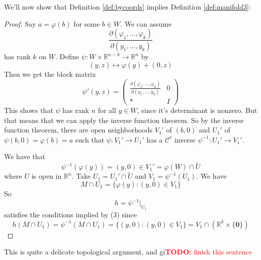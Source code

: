 \documentclass{article}
\newcommand{\reals}[0]{\mathbb{R}}
\newcommand{\mc}[1]{\mathcal{#1}}
\newcommand{\prt}[2]{\frac{\partial #1}{\partial #2}}
\newcommand{\mb}[1]{\mathbf{#1}}
\newcommand{\TODO}[1]{\textcolor{red}{\textbf{TODO:} #1}}
\begin{document}
We'll now show that Definition \ref{def:bycoords} implies Definition \ref{def:manifold3}:
\begin{proof}
  Say \(a = \varphi(b)\) for some \(b \in W\). We can assume
  \[\prt{(\varphi_1,...,\varphi_k)}{(y_1,...,y_k)}\]
  has rank \(k\) on \(W\).
  Define \(\psi: W \times \reals^{n - k} \to\reals^n\) by
  \[(y, z) \mapsto \varphi(y) + (0, z)\]
  Then we get the block matrix
  \[\psi'(y, z) = \begin{pmatrix}
    \prt{(\varphi_1,...,\varphi_k)}{(y_1,...,y_k)} & 0 \\
    * & I
  \end{pmatrix}\]
  This shows that \(\psi\) has rank \(n\) for all \(y \in W\), since it's determinant is nonzero. But that means that we can apply the inverse function theorem. So by the inverse function theorem, there are open neighborhoods \(V_1'\) of \((b, 0)\) and \(U_1'\) of \(\psi(b, 0) = \varphi(b) = a\) such that \(\psi: V_1' \to U_1'\) has a \(\mc{C}^r\) inverse \(\psi^{-1}: U_1' \to V_1'\).

  We have that
  \[\psi^{-1}(\varphi(y)) = (y, 0) \in V_1' = \varphi(W) \cap \widetilde U\]
  where \(U\) is open in \(\reals^n\). Take \(U_1 = U_1' \cap \widetilde U\) and \(V_1 = \psi^{-1}(U_1)\). We have
  \[M \cap U_1 = \{\varphi(y) : (y, 0) \in V_1\}\]
  So
  \[h = \psi^{-1}|_{U_1}\]
  satisfies the conditions implied by (3) since
  \[h(M \cap U_1) = \psi^{-1}(M \cap U_1) = \{(y, 0) : (y, 0) \in V_1\} = V_1 \cap (\reals^k \times \{\mb{0}\})\]
\end{proof}
This is quite a delicate topological argument, and gi\TODO{finish this sentence}
\end{document}
